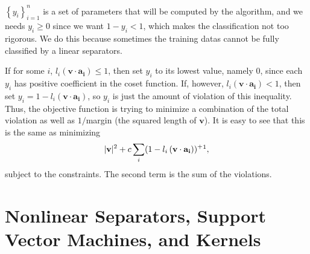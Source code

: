 \begin{note}
    \(\left\{ y_i \right\}_{i=1}^n \) is a set of parameters that will be computed by the algorithm, and we needs \(y_i \ge 0\) since we want \(1 - y_i < 1\), which makes the classification not too rigorous. We do this because sometimes the training datas cannot be fully classified by a linear separators.  
\end{note}

If for some \(i\), \(l_i \left( \mathbf{v} \cdot \mathbf{a_i}  \right) \le 1\), then set \(y_i\) to its lowest value, namely \(0\), since each \(y_i\) has positive coefficient in the coset function. If, however, \(l_i \left( \mathbf{v} \cdot \mathbf{a_i}  \right) < 1 \), then set \(y_i = 1 - l_i \left( \mathbf{v} \cdot \mathbf{a_i}  \right) \), so \(y_i\) is just the amount of violation of this inequality. Thus, the objective function is trying to minimize a combination of the total violation as well as \(1 /\)margin (the squared length of \(\mathbf{v} \)). It is easy to see that this is the same as minimizing 
\[
    \vert \mathbf{v}  \vert^2 + c \sum_{i} (1-l_i \left( \mathbf{v} \cdot \mathbf{a_i}  \right) )^+ \footnotemark, 
\]
subject to the constraints. The second term is the sum of the violations.

\section{Nonlinear Separators, Support Vector Machines, and Kernels}
